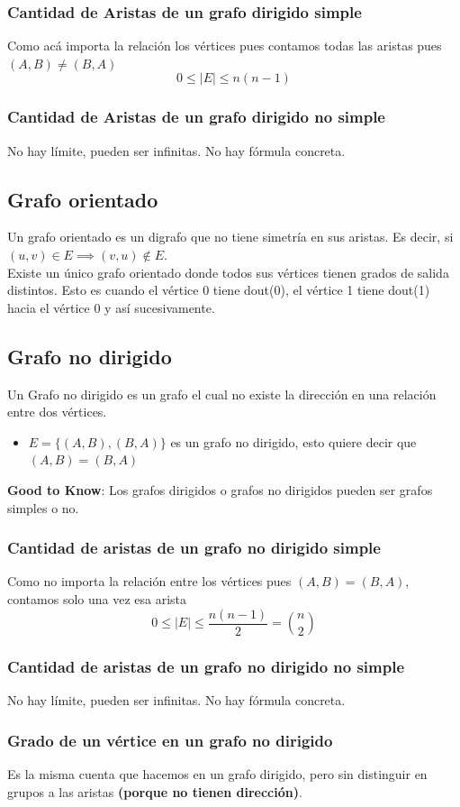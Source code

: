 \documentclass[10pt,a4paper]{article}
\begin{document}
\subsubsection*{Cantidad de Aristas de un grafo dirigido simple}
Como acá importa la relación los vértices pues contamos todas las aristas pues $(A,B) \neq (B,A)$ \[0 \leq |E| \leq n(n-1)\]
\subsubsection*{Cantidad de Aristas de un grafo dirigido no simple}
No hay límite, pueden ser infinitas. No hay fórmula concreta.
\subsection*{Grafo orientado}
Un grafo orientado es un digrafo que no tiene simetría en sus aristas. Es decir, si $ (u, v) \in E  \implies (v, u) \notin E$. \\
Existe un único grafo orientado donde todos sus vértices tienen grados de salida distintos. Esto es cuando el vértice 0 tiene dout(0), el vértice 1 tiene dout(1) hacia el vértice 0 y así sucesivamente.
\subsection*{Grafo no dirigido}
Un Grafo no dirigido es un grafo el cual no existe la dirección en una relación entre dos vértices.
\begin{itemize}
    \item $E = \{(A,B), (B, A) \}$ es un grafo no dirigido, esto quiere decir que $(A,B) = (B, A)$
\end{itemize}
\textbf{Good to Know}: Los grafos dirigidos o grafos no dirigidos pueden ser grafos simples o no.
\subsubsection*{Cantidad de aristas de un grafo no dirigido simple}
Como no importa la relación entre los vértices pues $(A,B) = (B,A)$, contamos solo una vez esa arista \[0 \leq |E| \leq \frac{n(n-1)}{2} = \binom{n}{2}\]
\subsubsection*{Cantidad de aristas de un grafo no dirigido no simple}
No hay límite, pueden ser infinitas. No hay fórmula concreta.
\subsubsection*{Grado de un vértice en un grafo no dirigido}
Es la misma cuenta que hacemos en un grafo dirigido, pero sin distinguir en grupos a las aristas \textbf{(porque no tienen dirección)}.
\end{document}
